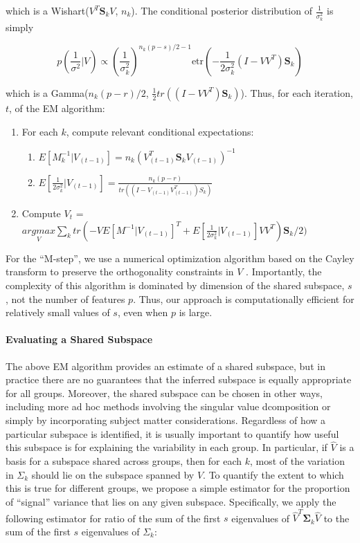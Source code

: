 \documentclass{article}
\newcommand{\bl}[1]{{\mathbf #1}}
\newcommand{\etr}{\text{etr}}
\begin{document}
\noindent which is a Wishart($V^T\mathbf{S}_kV$, $n_k$).  The
conditional posterior distribution of $\frac{1}{\sigma_k^2}$ is simply

$$p\left(\frac{1}{\sigma^2} | V\right) \propto \left(\frac{1}{\sigma_k^2}\right)^{n_k(p-s)/2-1}\etr\left(-\frac{1}{2\sigma^2_k} (I-VV^T)\mathbf{S}_k\right)  $$

\noindent which is a Gamma($n_k(p-r)/2$,
$\frac{1}{2}tr((I-VV^T)\mathbf{S}_k)$).  Thus, for each iteration,
$t$, of the EM algorithm:

\begin{enumerate}
\item For each $k$, compute relevant conditional expectations:
\begin{enumerate}
\item $E[M_k^{-1} | V_{(t-1)}] = n_k(V_{(t-1)}^T \mathbf{S}_kV_{(t-1)})^{-1}$
\item $E[\frac{1}{2\sigma_k^2}|V_{(t-1)}] = \frac{n_k(p-r)}{tr((I-V_{(t-1)}V_{(t-1)}^T)S_k)}$
\end{enumerate}
\item Compute $V_{t}$ = $\underset{V}{argmax}  \sum_k tr\left(-VE[M^{-1}|V_{(t-1)}]^T +
       E[\frac{1}{2\sigma_k^2}|V_{(t-1)}]VV^T\right)\mathbf{S}_k/2)$ 
\end{enumerate}

For the ``M-step'', we use a numerical optimization algorithm based on
the Cayley transform to preserve the orthogonality constraints in $V$
\citep{Wen2013}.  Importantly, the complexity of this algorithm is
dominated by dimension of the shared subspace, $s$, not the number of
features $p$.  Thus, our approach is computationally efficient for
relatively small values of $s$, even when $p$ is large.



\paragraph{Evaluating a Shared Subspace}

The above EM algorithm provides an estimate of a shared subspace, but
in practice there are no guarantees that the inferred subspace is
equally appropriate for all groups.  Moreover, the shared subspace can
be chosen in other ways, including more ad hoc methods
involving the singular value dcomposition or simply by incorporating
subject matter considerations.  Regardless of how a particular
subspace is identified, it is usually important to quantify how useful
this subspace is for explaining the variability in each group.  In
particular, if $\hat{V}$ is a basis for a subspace shared across
groups, then for each $k$, most of the variation in $\Sigma_k$ should
lie on the subspace spanned by $\hat{V}$.  To quantify the extent to
which this is true for different groups, we propose a simple estimator
for the proportion of ``signal'' variance that lies on any given
subspace.  Specifically, we apply the following estimator for ratio of
the sum of the first $s$ eigenvalues of
$\hat{V}^T\bl \Sigma_k \hat{V}$ to the sum of the first $s$
eigenvalues of $\Sigma_k$:
\end{document}
